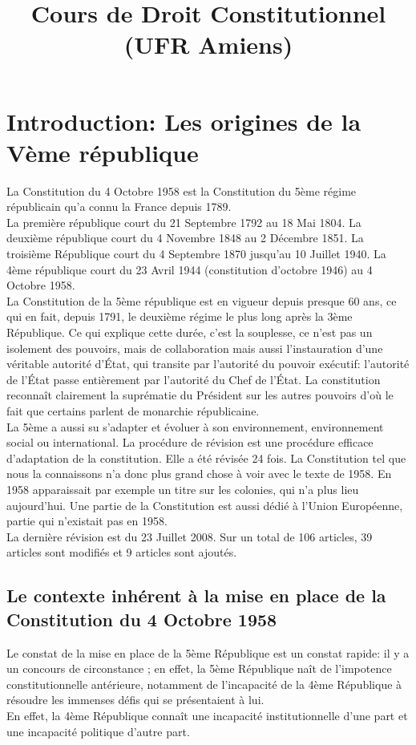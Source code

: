 \documentclass[12pt, a4paper, openany]{book}
\date{}
\title{Cours de Droit Constitutionnel (UFR Amiens)}
\begin{document}
\chapter{Introduction: Les origines de la Vème république}

La Constitution du 4 Octobre 1958 est la Constitution du 5ème régime républicain qu'a connu la France depuis 1789. \\
La première république court du 21 Septembre 1792 au 18 Mai 1804. La deuxième république court du 4 Novembre 1848 au 2 Décembre 1851. La troisième République court du 4 Septembre 1870 jusqu'au 10 Juillet 1940. La 4ème république court du 23 Avril 1944 (constitution d'octobre 1946) au 4 Octobre 1958. \\
La Constitution de la 5ème république est en vigueur depuis presque 60 ans, ce qui en fait, depuis 1791, le deuxième régime le plus long après la 3ème République. Ce qui explique cette durée, c'est la souplesse, ce n'est pas un isolement des pouvoirs, mais de collaboration mais aussi l'instauration d'une véritable autorité d'État, qui transite par l'autorité du pouvoir exécutif: l'autorité de l'État passe entièrement par l'autorité du Chef de l'État. La constitution reconnaît clairement la suprématie du Président sur les autres pouvoirs d'où le fait que certains parlent de monarchie républicaine. \\
La 5ème a aussi su s'adapter et évoluer à son environnement, environnement social ou international. La procédure de révision est une procédure efficace d'adaptation de la constitution. Elle a été révisée 24 fois. La Constitution tel que nous la connaissons n'a donc plus grand chose à voir avec le texte de 1958. En 1958 apparaissait par exemple un titre sur les colonies, qui n'a plus lieu aujourd'hui. Une partie de la Constitution est aussi dédié à l'Union Européenne, partie qui n'existait pas en 1958. \\
La dernière révision est du 23 Juillet 2008. Sur un total de 106 articles, 39 articles sont modifiés et 9 articles sont ajoutés. 

\section{Le contexte inhérent à la mise en place de la Constitution du 4 Octobre 1958}

Le constat de la mise en place de la 5ème République est un constat rapide: il y a un concours de circonstance ; en effet, la 5ème République naît de l'impotence constitutionnelle antérieure, notamment de l'incapacité de la 4ème République à résoudre les immenses défis qui se présentaient à lui. \\
En effet, la 4ème République connaît une incapacité institutionnelle d'une part et une incapacité politique d'autre part.
\end{document}
